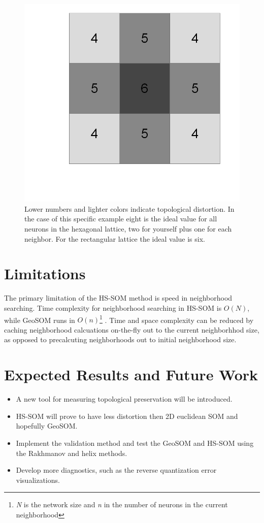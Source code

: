 \documentclass[12pt]{article}
\begin{document}
\begin{figure}
\centering
\includegraphics[width=0.4\linewidth]{figure_rect.png}
\caption{Lower numbers and lighter colors indicate topological distortion.  In
the case of this specific example eight is the ideal value for all neurons in
the hexagonal lattice, two for yourself plus one for each neighbor.  For the
rectangular lattice the ideal value is six.}
\label{figure3}
\end{figure}

\section{Limitations}
The primary limitation of the HS-SOM method is speed in neighborhood
searching. Time complexity for neighborhood searching in HS-SOM is
\begin{math}O(N)\end{math}, while GeoSOM runs in
\begin{math}O(n)\end{math}\footnote{\textit{N} is the network size and
\textit{n} in the number of neurons in the current
neighborhood} \citep{Wu:2006lr}. Time and space complexity can be reduced by
caching neighborhood calcuations on-the-fly out to the current neighborhhod
size, as opposed to precalcuting neighborhoods out to initial neighborhood
size.
\section{Expected Results and Future Work}
\begin{itemize}
\item A new tool for measuring topological preservation will be introduced.
\item HS-SOM will prove to have less distortion then 2D euclidean SOM and hopefully GeoSOM.
\item Implement the validation method and test the GeoSOM and HS-SOM using the Rakhmanov and helix methods.
\item Develop more diagnostics, such as the reverse quantization error visualizations.
\end{itemize}





\end{document}

